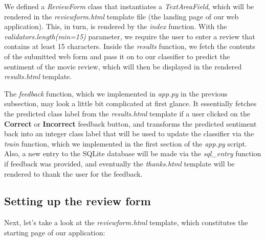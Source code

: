 \documentclass[11pt]{article}
\begin{document}
    We defined a \emph{ReviewForm} class that instantiates a
\emph{TextAreaField}, which will be rendered in the
\emph{reviewform.html} template file (the landing page of our web
application). This, in turn, is rendered by the \emph{index} function.
With the \emph{validators.length(min=15)} parameter, we require the user
to enter a review that contains at least 15 characters. Inside the
\emph{results} function, we fetch the contents of the submitted web form
and pass it on to our classifier to predict the sentiment of the movie
review, which will then be displayed in the rendered \emph{results.html}
template.

The \emph{feedback} function, which we implemented in \emph{app.py} in
the previous subsection, may look a little bit complicated at first
glance. It essentially fetches the predicted class label from the
\emph{results.html} template if a user clicked on the \textbf{Correct}
or \textbf{Incorrect} feedback button, and transforms the predicted
sentiment back into an integer class label that will be used to update
the classifier via the \emph{train} function, which we implemented in
the first section of the \emph{app.py} script. Also, a new entry to the
SQLite database will be made via the \emph{sql\_entry} function if
feedback was provided, and eventually the \emph{thanks.html} template
will be rendered to thank the user for the feedback.

    \subsection{Setting up the review
form}\label{setting-up-the-review-form}

    Next, let's take a look at the \emph{reviewform.html} template, which
constitutes the starting page of our application:
\end{document}

